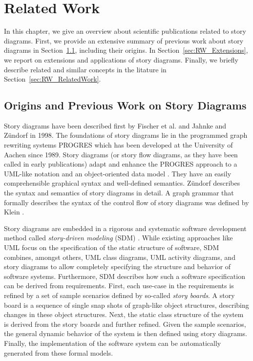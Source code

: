 \chapter{Related Work} \label{sec:RelatedWork}
In this chapter, we give an overview about scientific publications related to story diagrams.
First, we provide an extensive summary of previous work about story diagrams in Section~\ref{sec:RW_PreviousWork}, including their origins.
In Section~\ref{sec:RW_Extensions}, we report on extensions and applications of story diagrams.
Finally, we briefly describe related and similar concepts in the litature in Section~\ref{sec:RW_RelatedWork}.

\section{Origins and Previous Work on Story Diagrams}
\label{sec:RW_PreviousWork}

Story diagrams have been described first by Fischer et al. \cite{FNTZ00} and Jahnke and Z\"{u}ndorf \cite{JZ98} in 1998.
The foundations of story diagrams lie in the programmed graph rewriting systems PROGRES \cite{SWZ95} which has been developed at the University of Aachen since 1989.
Story diagrams (or story flow diagrams, as they have been called in early publications) adapt and enhance the PROGRES approach to a UML-like notation and an object-oriented data model \cite{JZ98}.
They have an easily comprehensible graphical syntax and well-defined semantics.
Z\"{u}ndorf \cite{Zun01} describes the syntax and semantics of story diagrams in detail.
A graph grammar that formally describes the syntax of the control flow of story diagrams was defined by Klein \cite{Kle99}.

Story diagrams are embedded in a rigorous and systematic software development method called \emph{story-driven modeling} (SDM) \cite{Zun01,DGZ04}.
While existing approaches like UML focus on the specification of the static structure of software, SDM combines, amongst others, UML class diagrams, UML activity diagrams, and story diagrams to allow completely specifying the structure and behavior of software systems.
Furthermore, SDM describes how such a software specification can be derived from requirements.
First, each use-case in the requirements is refined by a set of sample scenarios defined by so-called \emph{story boards}.
A story board is a sequence of single snap shots of graph-like object structures, describing changes in these object structures.
Next, the static class structure of the system is derived from the story boards and further refined.
Given the sample scenarios, the general dynamic behavior of the system is then defined using story diagrams.
Finally, the implementation of the software system can be automatically generated from these formal models.

